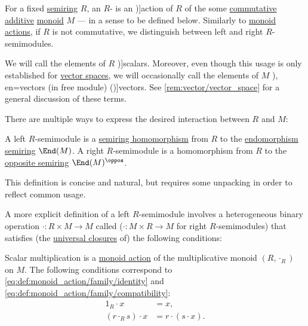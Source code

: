 \begin{definition}\label{def:semimodule}
  For a fixed \hyperref[def:semiring]{semiring} \( R \), an \( R \)- is an \term[en=action of ring on Abelian group (\cite[156]{Aluffi2009Algebra})]{action} of \( R \) of the some \hyperref[def:monoid/commutative]{commutative} \hyperref[def:additive_semigroup]{additive} \hyperref[def:monoid]{monoid} \( M \) --- in a sense to be defined below. Similarly to \hyperref[def:monoid_action]{monoid actions}, if \( R \) is not commutative, we distinguish between left and right \( R \)-semimodules.

  We will call the elements of \( R \) \term[en=scalars (in module) (\cite[192]{Bourbaki1998Algebra1to3})]{scalars}. Moreover, even though this usage is only established for \hyperref[def:vector_space]{vector spaces}, we will occasionally call the elements of \( M \) \term[ru=векторы (в модуле) (\cite[78]{Мальцев2009ОсновыЛинейнойАлгебры}), en=vectors (in free module) (\cite[308]{Aluffi2009Algebra})]{vectors}. See \cref{rem:vector/vector_space} for a general discussion of these terms.

  There are multiple ways to express the desired interaction between \( R \) and \( M \):
  \begin{thmenum}[series=def:semimodule]
    \mimprovised A left \( R \)-semimodule is a \hyperref[def:semiring/morphism]{semiring homomorphism} from \( R \) to the \hyperref[def:endomorphism_semiring]{endomorphism semiring} \( \End(M) \). A right \( R \)-semimodule is a homomorphism from \( R \) to the \hyperref[def:semiring/opposite]{opposite semiring} \( \End(M)^\oppos \).

    This definition is concise and natural, but requires some unpacking in order to reflect common usage.

     A more explicit definition of a left \( R \)-semimodule involves a heterogeneous binary operation \( \cdot: R \times M \to M \) called  (\( \cdot: M \times R \to M \) for right \( R \)-semimodules) that satisfies (the \hyperref[def:fol_quantifier_closure]{universal closures} of) the following conditions:
    \begin{thmenum}
       Scalar multiplication is a \hyperref[def:monoid_action]{monoid action} of the multiplicative monoid \( (R, \cdot_R) \) on \( M \). The following conditions correspond to \eqref{eq:def:monoid_action/family/identity} and \eqref{eq:def:monoid_action/family/compatibility}:
      \begin{align}
        1_R \cdot x           &= x, \label{eq:def:semimodule/operation/action/identity} \\
        (r \cdot_R s) \cdot x &= r \cdot (s \cdot x). \label{eq:def:semimodule/operation/action/compatibility}
      \end{align}


\end{thmenum}
\end{thmenum}
\end{definition}
